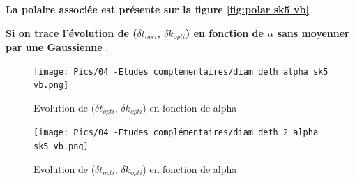 \textbf{La polaire associée est présente sur la figure \ref{fig:polar sk5 vb}}

\textbf{Si on trace l'évolution de ($\delta t_{opti}$, $\delta k_{opti}$) en fonction de $\alpha$ sans moyenner par une Gaussienne} :\\

\begin{figure}[H]
    \centering
    \texttt{[image: Pics/04 -Etudes complémentaires/diam deth alpha sk5 vb.png]}
    \caption{Evolution de ($\delta t_{opti}$, $\delta k_{opti}$) en fonction de alpha}
    \label{fig:diam depth alpha sk5 vb}
\end{figure}

\begin{figure}[H]
    \centering
    \texttt{[image: Pics/04 -Etudes complémentaires/diam deth 2 alpha sk5 vb.png]}
    \caption{Evolution de ($\delta t_{opti}$, $\delta k_{opti}$) en fonction de alpha}
    \label{fig:diam depth 2 alpha sk5 vb}
\end{figure}